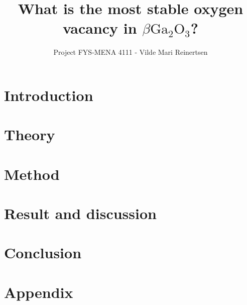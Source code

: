 

\title{What is the most stable oxygen vacancy in $\beta \text{Ga}_2\text{O}_3$?}
\author{Project FYS-MENA 4111 - Vilde Mari Reinertsen}
\raggedbottom



\maketitle

\begin{abstract}

  
\tableofcontents
\end{abstract}

\twocolumn

\section{Introduction}


\section{Theory}


\section{Method}


\section{Result and discussion}


%

\section{Conclusion}


\newpage



\section*{Appendix}



